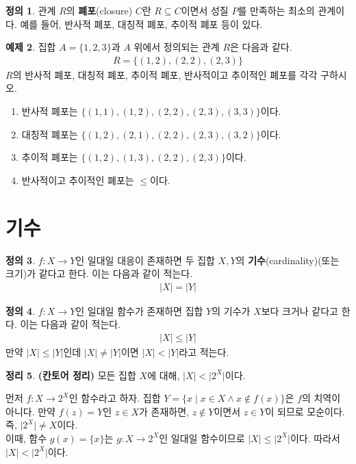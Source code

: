 \documentclass[b5paper, 11pt]{book}
\theoremstyle{definition}
\newtheorem{defn}{정의}[chapter]
\newtheorem{thm}[defn]{정리}
\newtheorem{ex}[defn]{예제}
\newenvironment{pf*}{\pushQED{\qed}\pf}
{\popQED\endpf}
\begin{document}
\begin{defn}
    관계 $R$의 \textbf{폐포}(closure) $C$란 $R \subseteq C$이면서 성질 $P$를 만족하는 최소의
    관계이다. 예를 들어, 반사적 폐포, 대칭적 폐포, 추이적 폐포 등이 있다. 
\end{defn}
\begin{ex}
    집합 $A = \{1, 2, 3\}$과 $A$ 위에서 정의되는 관계 $R$은 다음과 같다.
    \begin{align*}
        R = \{(1,2), (2, 2), (2, 3)\}
    \end{align*}
    $R$의 반사적 폐포, 대칭적 폐포, 추이적 폐포, 반사적이고 추이적인 폐포를 각각 구하시오.
    \begin{enumerate}
        \item 반사적 폐포는 $\{(1, 1), (1, 2), (2, 2), (2, 3), (3, 3)\}$이다.
        \item 대칭적 폐포는 $\{(1, 2), (2, 1), (2, 2), (2, 3), (3, 2)\}$이다.
        \item 추이적 폐포는 $\{(1, 2),(1, 3), (2, 2), (2, 3) \}$이다.
        \item 반사적이고 추이적인 폐포는 $\le$이다. 
    \end{enumerate}
\end{ex}
\section{기수}
\begin{defn}
    $f: X \rightarrow Y$인 일대일 대응이 존재하면
    두 집합 $X, Y$의 \textbf{기수}(cardinality)(또는 크기)가 같다고 한다.
     이는 다음과 같이 적는다.
    \begin{align*}
        \vert X \vert = \vert Y \vert
    \end{align*}
\end{defn}
\begin{defn}
    $f: X \rightarrow Y$인 일대일 함수가
    존재하면 집합 $Y$의 기수가 $X$보다 크거나 같다고 한다. 이는 다음과 같이 적는다.
    \begin{align*}
        \vert X \vert \le \vert Y \vert
    \end{align*} 
    만약 $\vert X \vert \le \vert Y \vert$인데 $\vert X \vert \neq \vert Y \vert$이면
    $\vert X \vert < \vert Y \vert$라고 적는다.
\end{defn}
\begin{thm}
    \textbf{(칸토어 정리)} 모든 집합 $X$에 대해, $\vert X \vert < \vert 2^X \vert$이다.
\end{thm}
\begin{pf*}
    먼저 $f: X \rightarrow 2^X$인 함수라고 하자. 집합 $Y = \{x \;\vert\; x \in X \wedge
    x \notin f(x)\}$은 $f$의 치역이 아니다. 만약 $f(z) = Y$인 $z \in X$가 존재하면,
    $z \notin Y$이면서 $z \in Y$이 되므로 모순이다. 즉, $\vert 2^X \vert
    \neq X$이다. \\ 
    이때, 함수 $g(x) = \{x\}$는 $g: X \rightarrow 2^X$인 일대일 함수이므로
    $\vert X \vert \le \vert 2^X \vert$이다. 따라서 $\vert X \vert < \vert 2^X \vert$이다.
\end{pf*}
\end{document}
